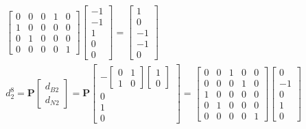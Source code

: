 \documentclass[11pt]{article}
\begin{document}
\begin{enumerate}
\begin{align*}
\begin{bmatrix}
        0 & 0 & 0 & 1 & 0 \\
        1 & 0 & 0 & 0 & 0 \\
        0 & 1 & 0 & 0 & 0 \\
        0 & 0 & 0 & 0 & 1
      \end{bmatrix}
      \begin{bmatrix}
        -1 \\ -1 \\ 1 \\ 0 \\ 0
      \end{bmatrix}
      =
      \begin{bmatrix}
        1 \\ 0 \\ -1 \\ -1 \\ 0
      \end{bmatrix}
      \\
      d_2^8 = \textbf{P}
      \begin{bmatrix}
         d_{B2} \\ d_{N2}
      \end{bmatrix}
      =
      \textbf{P}
      \begin{bmatrix}
        -
        \begin{bmatrix}
         0 & 1 \\ 1 & 0   
        \end{bmatrix}
        \begin{bmatrix}
            1 \\ 0
        \end{bmatrix} \\
        0 \\ 1 \\ 0
      \end{bmatrix}
      = 
      \begin{bmatrix}
        0 & 0 & 1 & 0 & 0 \\
        0 & 0 & 0 & 1 & 0 \\
        1 & 0 & 0 & 0 & 0 \\
        0 & 1 & 0 & 0 & 0 \\
        0 & 0 & 0 & 0 & 1
      \end{bmatrix}
      \begin{bmatrix}
        0 \\ -1 \\ 0 \\ 1 \\ 0
      \end{bmatrix}

\end{align*}
\end{enumerate}
\end{document}

